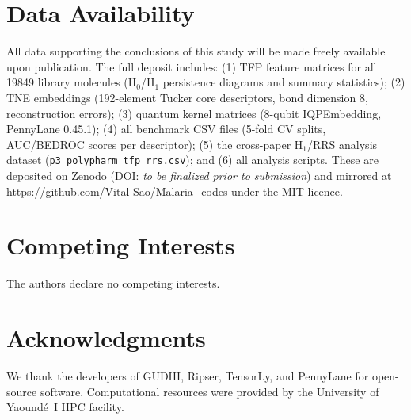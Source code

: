 \documentclass[11pt,a4paper]{article}
\begin{document}
\section*{Data Availability}

All data supporting the conclusions of this study will be made freely available upon publication. The full deposit includes: (1) TFP feature matrices for all \num{19849} library molecules (H$_0$/H$_1$ persistence diagrams and summary statistics); (2) TNE embeddings (\num{192}-element Tucker core descriptors, bond dimension 8, reconstruction errors); (3) quantum kernel matrices (8-qubit IQPEmbedding, PennyLane 0.45.1); (4) all benchmark CSV files (5-fold CV splits, AUC/BEDROC scores per descriptor); (5) the cross-paper H$_1$/RRS analysis dataset (\texttt{p3\_polypharm\_tfp\_rrs.csv}); and (6) all analysis scripts. These are deposited on Zenodo (DOI: \textit{to be finalized prior to submission}) and mirrored at \url{https://github.com/Vital-Sao/Malaria_codes} under the MIT licence.

\section*{Competing Interests}

The authors declare no competing interests.

\section*{Acknowledgments}

We thank the developers of GUDHI, Ripser, TensorLy, and PennyLane for open-source software. Computational resources were provided by the University of Yaound\'{e}~I HPC facility.




\end{document}

